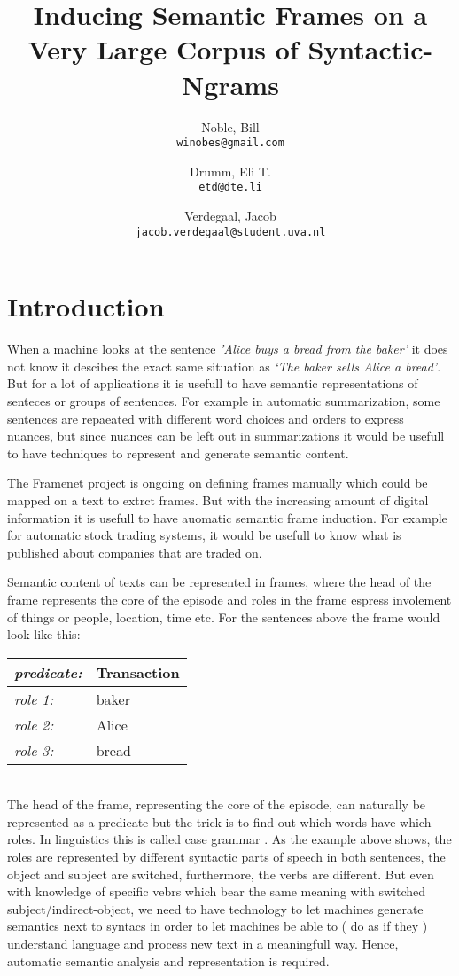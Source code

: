 \documentclass[11pt,twocolumn,DIV=11]{scrartcl}
\author{
    Noble, Bill\\
    \texttt{winobes@gmail.com}
    \and
    Drumm, Eli T.\\
    \texttt{etd@dte.li}
    \and
    Verdegaal, Jacob\\
    \texttt{jacob.verdegaal@student.uva.nl}
}
\title{Inducing Semantic Frames on a Very Large Corpus of Syntactic-Ngrams}
\begin{document}
\maketitle

\section{Introduction}
When a machine looks at the sentence \textit{'Alice buys a bread from the baker'} it does not know it descibes the exact same situation as \textit{`The baker sells Alice a bread'}. But for a lot of applications it is usefull to have semantic representations of senteces or groups of sentences. For example in automatic summarization, some sentences are repaeated with different word choices and orders to express nuances, but since nuances can be left out in summarizations it would be usefull to have techniques to represent and generate semantic content. 

The Framenet project \citep{framenet} is ongoing on defining frames manually which could be mapped on a text to extrct frames. But with the increasing amount of digital information it is usefull to have auomatic semantic frame induction. For example for automatic stock trading systems, it would be usefull to know what is published about companies that are traded on. 

Semantic content of texts can be represented in frames, where the head of the frame represents the core of the episode and roles in the frame espress involement of things or people, location, time etc. For the sentences above the frame would look like this:\\

\begin{tabular}{|l l|}
  \hline
  \textit{\small predicate:\normalsize}&Transaction\\
  \hline
  \hline
  \textit{\small role 1:\normalsize} &baker\\
  \textit{\small role 2:\normalsize} &Alice\\
  \textit{\small role 3:\normalsize} &bread\\
  \hline
\end{tabular}\\

The head of the frame, representing the core of the episode, can naturally be represented as a predicate but the trick is to find out which words have which roles. In linguistics this is called case grammar \citep{dowty1991}. As the example above shows, the roles are represented by different syntactic parts of speech in both sentences, the object and subject are switched, furthermore, the verbs are different. But even with knowledge of specific vebrs which bear the same meaning with switched subject/indirect-object, we need to have technology to let machines generate semantics next to syntacs in order to let machines be able to ( do as if they ) understand language and process new text in a meaningfull way. Hence, automatic semantic analysis and representation is required.\\ 
\end{document}
